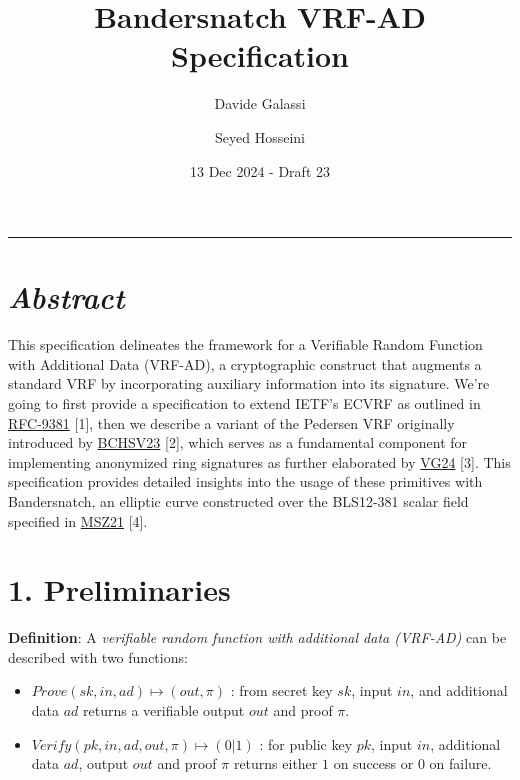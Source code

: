 \documentclass[
]{article}
\title{Bandersnatch VRF-AD Specification}
\author{Davide Galassi \and Seyed Hosseini}
\date{13 Dec 2024 - Draft 23}
\begin{document}
\maketitle

\newcommand{\G}{\langle G \rangle}
\newcommand{\F}{\mathbb{Z}^*_r}

\begin{center}\rule{0.5\linewidth}{0.5pt}\end{center}

\hypertarget{abstract}{%
\section{\texorpdfstring{\emph{Abstract}}{Abstract}}\label{abstract}}

This specification delineates the framework for a Verifiable Random
Function with Additional Data (VRF-AD), a cryptographic construct that
augments a standard VRF by incorporating auxiliary information into its
signature. We're going to first provide a specification to extend IETF's
ECVRF as outlined in
\href{https://datatracker.ietf.org/doc/rfc9381}{RFC-9381} {[}1{]}, then
we describe a variant of the Pedersen VRF originally introduced by
\href{https://eprint.iacr.org/2023/002}{BCHSV23} {[}2{]}, which serves
as a fundamental component for implementing anonymized ring signatures
as further elaborated by
\href{https://github.com/davxy/ring-proof-spec}{VG24} {[}3{]}. This
specification provides detailed insights into the usage of these
primitives with Bandersnatch, an elliptic curve constructed over the
BLS12-381 scalar field specified in
\href{https://eprint.iacr.org/2021/1152}{MSZ21} {[}4{]}.

\hypertarget{preliminaries}{%
\section{1. Preliminaries}\label{preliminaries}}

\textbf{Definition}: A \emph{verifiable random function with additional
data (VRF-AD)} can be described with two functions:

\begin{itemize}
\item
  \(Prove(sk,in,ad) \mapsto (out,\pi)\) : from secret key \(sk\), input
  \(in\), and additional data \(ad\) returns a verifiable output \(out\)
  and proof \(\pi\).
\item
  \(Verify(pk,in,ad,out,\pi) \mapsto (0|1)\) : for public key \(pk\),
  input \(in\), additional data \(ad\), output \(out\) and proof \(\pi\)
  returns either \(1\) on success or \(0\) on failure.
\end{itemize}
\end{document}
